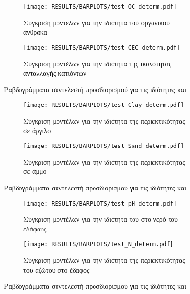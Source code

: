 \begin{figure}[H]
    \begin{subfigure}{0.5\textwidth}
        \texttt{[image: RESULTS/BARPLOTS/test\_OC\_determ.pdf]}
        \caption{Σύγκριση μοντέλων για την ιδιότητα του οργανικού άνθρακα}
        \label{fig:OC_determ}
    \end{subfigure}
    \begin{subfigure}{0.5\textwidth}
        \texttt{[image: RESULTS/BARPLOTS/test\_CEC\_determ.pdf]}
        \caption{Σύγκριση μοντέλων για την ιδιότητα της ικανότητας ανταλλαγής κατιόντων}
        \label{fig:CEC_determ}
    \end{subfigure}
    \caption{Ραβδογράμματα συντελεστή προσδιορισμού για τις ιδιότητες  και }
    \label{fig:barpl-OC-CEC}
\end{figure}
\begin{figure}[H]
    \begin{subfigure}{0.5\textwidth}
        \texttt{[image: RESULTS/BARPLOTS/test\_Clay\_determ.pdf]}
        \caption{Σύγκριση μοντέλων για την ιδιότητα της περιεκτικότητας σε άργιλο}
        \label{fig:Clay_determ}
    \end{subfigure}
    \begin{subfigure}{0.5\textwidth}
        \texttt{[image: RESULTS/BARPLOTS/test\_Sand\_determ.pdf]}
        \caption{Σύγκριση μοντέλων για την ιδιότητα της περιεκτικότητας σε άμμο}
        \label{fig:Sand_determ}
    \end{subfigure}
    \caption{Ραβδογράμματα συντελεστή προσδιορισμού για τις ιδιότητες  και }
    \label{fig:barpl-Clay-Sand}
\end{figure}
\begin{figure}[H]
    \begin{subfigure}{0.5\textwidth}
        \texttt{[image: RESULTS/BARPLOTS/test\_pH\_determ.pdf]}
        \caption{Σύγκριση μοντέλων για την ιδιότητα του  στο νερό του εδάφους}
        \label{fig:pH_determ}
    \end{subfigure}
    \begin{subfigure}{0.5\textwidth}
        \texttt{[image: RESULTS/BARPLOTS/test\_N\_determ.pdf]}
        \caption{Σύγκριση μοντέλων για την ιδιότητα της περιεκτικότητας του αζώτου στο έδαφος}
        \label{fig:N_determ}
    \end{subfigure}
    \caption{Ραβδογράμματα συντελεστή προσδιορισμού για τις ιδιότητες  και }
    \label{fig:barpl-pH-N}
\end{figure}
